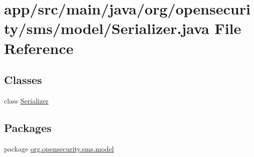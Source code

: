 \hypertarget{a00028}{\section{app/src/main/java/org/opensecurity/sms/model/\+Serializer.java File Reference}
\label{a00028}
}
\subsection*{Classes}
\begin{DoxyCompactItemize}
\item 
class \hyperlink{a00015}{Serializer}
\end{DoxyCompactItemize}
\subsection*{Packages}
\begin{DoxyCompactItemize}
\item 
package \hyperlink{a00036}{org.\+opensecurity.\+sms.\+model}
\end{DoxyCompactItemize}
